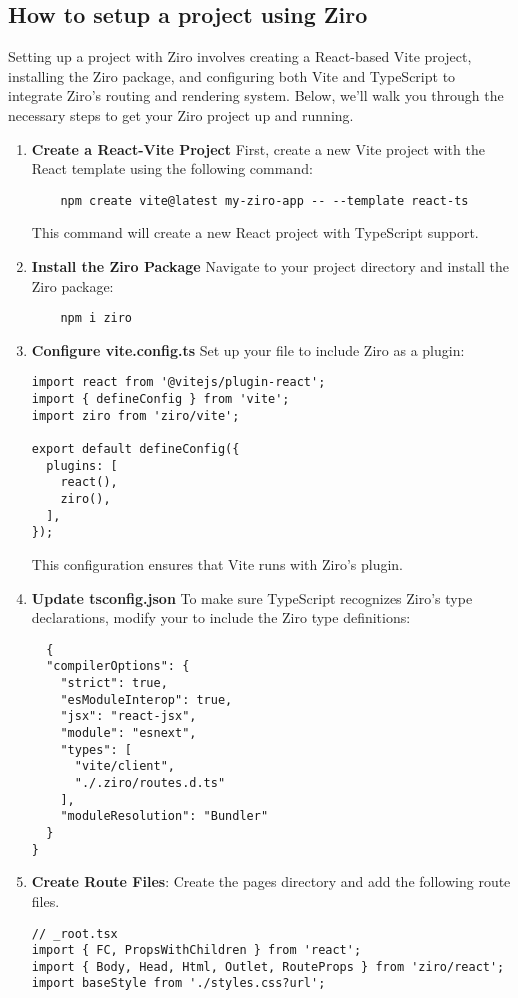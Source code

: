 \subsection{How to setup a project using Ziro}

Setting up a project with Ziro involves creating a React-based Vite project, installing the Ziro package, and configuring both Vite and TypeScript to integrate Ziro's routing and rendering system. Below, we'll walk you through the necessary steps to get your Ziro project up and running.

\begin{enumerate}
  \item \textbf{Create a React-Vite Project} First, create a new Vite project with the React template using the following command:
  \begin{verbatim}
    npm create vite@latest my-ziro-app -- --template react-ts
  \end{verbatim}
  This command will create a new React project with TypeScript support.

  \item \textbf{Install the Ziro Package} Navigate to your project directory and install the Ziro package:
  \begin{verbatim}
    npm i ziro
  \end{verbatim}
  \item \textbf{Configure vite.config.ts} Set up your  file to include Ziro as a plugin:
  \begin{verbatim}
import react from '@vitejs/plugin-react';
import { defineConfig } from 'vite';
import ziro from 'ziro/vite';

export default defineConfig({
  plugins: [
    react(),
    ziro(),
  ],
});
\end{verbatim}
This configuration ensures that Vite runs with Ziro’s plugin.

\item \textbf{Update tsconfig.json} To make sure TypeScript recognizes Ziro's type declarations, modify your  to include the Ziro type definitions:
\begin{verbatim}
  {
  "compilerOptions": {
    "strict": true,
    "esModuleInterop": true,
    "jsx": "react-jsx",
    "module": "esnext",
    "types": [
      "vite/client",
      "./.ziro/routes.d.ts"
    ],
    "moduleResolution": "Bundler"
  }
}
\end{verbatim}

\item \textbf{Create Route Files}: Create the pages directory and add the following route files.
  \begin{verbatim}
// _root.tsx
import { FC, PropsWithChildren } from 'react';
import { Body, Head, Html, Outlet, RouteProps } from 'ziro/react';
import baseStyle from './styles.css?url';


\end{verbatim}
\end{enumerate}
